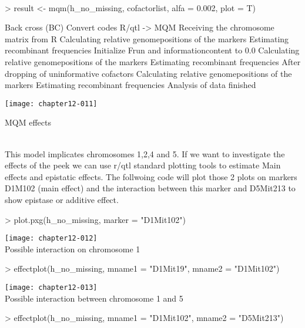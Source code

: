 \documentclass[a4paper]{article}
\begin{document}
\\
\begin{Schunk}
\begin{Sinput}
> result <- mqm(h_no_missing, cofactorlist, alfa = 0.002, plot = T)
\end{Sinput}
\begin{Soutput}
Back cross (BC)
Convert codes R/qtl -> MQM
Receiving the chromosome matrix from R
Calculating relative genomepositions of the markers
Estimating recombinant frequencies
Initialize Frun and informationcontent to 0.0
Calculating relative genomepositions of the markers
Estimating recombinant frequencies
After dropping of uninformative cofactors
Calculating relative genomepositions of the markers
Estimating recombinant frequencies
Analysis of data finished
\end{Soutput}
\end{Schunk}
\texttt{[image: chapter12-011]}
\clearpage
\begin{Large} MQM effects \end{Large}\\
This model implicates chromosomes 1,2,4 and 5. If we want to investigate the effects of the peek we can use r/qtl standard plotting tools
to estimate Main effects and epistatic effects. The follwoing code will plot those 2 plots on markers D1M102 (main effect) and the interaction between this marker and D5Mit213 to show epistase or additive effect.
\\
\begin{Schunk}
\begin{Sinput}
> plot.pxg(h_no_missing, marker = "D1Mit102")
\end{Sinput}
\end{Schunk}
\texttt{[image: chapter12-012]}
\\
Possible interaction on chromosome 1
\\
\begin{Schunk}
\begin{Sinput}
> effectplot(h_no_missing, mname1 = "D1Mit19", mname2 = "D1Mit102")
\end{Sinput}
\end{Schunk}
\texttt{[image: chapter12-013]}
\\
Possible interaction between chromosome 1 and 5
\\
\begin{Schunk}
\begin{Sinput}
> effectplot(h_no_missing, mname1 = "D1Mit102", mname2 = "D5Mit213")
\end{Sinput}
\end{Schunk}
\end{document}
